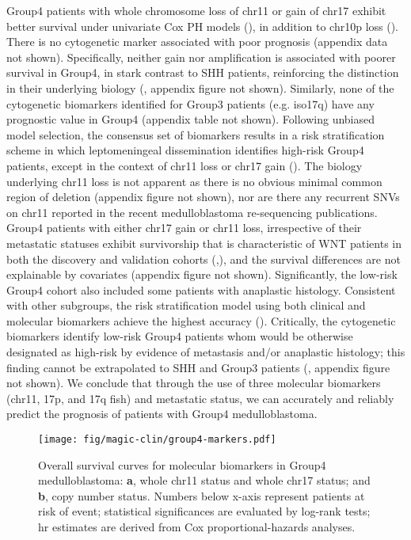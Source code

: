 Group4 patients with whole chromosome loss of chr11 or gain of chr17 exhibit better survival under univariate Cox PH models (), in addition to chr10p loss (). There is no cytogenetic marker associated with poor prognosis (appendix data not shown). Specifically, neither  gain nor amplification is associated with poorer survival in Group4, in stark contrast to SHH patients, reinforcing the distinction in their underlying biology (, appendix figure not shown). Similarly, none of the cytogenetic biomarkers identified for Group3 patients (e.g. iso17q) have any prognostic value in Group4 (appendix table not shown). Following unbiased model selection, the consensus set of biomarkers results in a risk stratification scheme in which leptomeningeal dissemination identifies high-risk Group4 patients, except in the context of chr11 loss or chr17 gain (). The biology underlying chr11 loss is not apparent as there is no obvious minimal common region of deletion (appendix figure not shown), nor are there any recurrent SNVs on chr11 reported in the recent medulloblastoma re-sequencing publications. Group4 patients with either chr17 gain or chr11 loss, irrespective of their metastatic statuses exhibit survivorship that is characteristic of WNT patients in both the discovery and validation cohorts (,), and the survival differences are not explainable by covariates (appendix figure not shown). Significantly, the low-risk Group4 cohort also included some patients with anaplastic histology. Consistent with other subgroups, the risk stratification model using both clinical and molecular biomarkers achieve the highest accuracy (). Critically, the cytogenetic biomarkers identify low-risk Group4 patients whom would be otherwise designated as high-risk by evidence of metastasis and/or anaplastic histology; this finding cannot be extrapolated to SHH and Group3 patients (, appendix figure not shown).  We conclude that through the use of three molecular biomarkers (chr11, 17p, and 17q \gls{fish}) and metastatic status, we can accurately and reliably predict the prognosis of patients with Group4 medulloblastoma.

\bigskip

\begin{figure}[h]
	\begin{center}
		\texttt{[image: fig/magic-clin/group4-markers.pdf]}
	\end{center}
	\caption[Overall survival curves for molecular biomarkers in Group4 medulloblastoma]
	{
	Overall survival curves for molecular biomarkers in Group4 medulloblastoma:
	\textbf{a}, whole chr11 status and whole chr17 status; and
	\textbf{b},  copy number status.
	Numbers below x-axis represent patients at risk of event; statistical significances are evaluated by log-rank tests; \gls{hr} estimates are derived from Cox proportional-hazards analyses.
	}
	\label{fig:group4-markers}
\end{figure}

